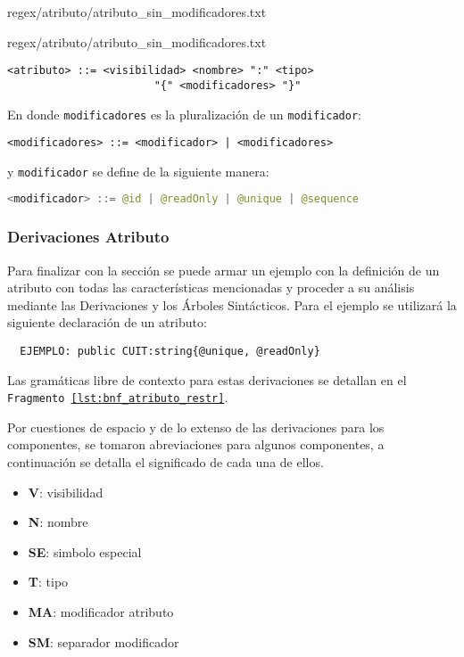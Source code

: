 \begin{lstinputlisting}[language=Director, basicstyle=\footnotesize\ttfamily, caption={Regex - Atributo (sin
Modificadores)}, label=lstreatr]{regex/atributo/atributo_sin_modificadores.txt}
\begin{lstinputlisting} [basicstyle=\footnotesize, caption={Regex - Modificadores
  (Atributo)},
  label=lstreatrmodif]{regex/atributo/atributo_sin_modificadores.txt}
\begin{lstlisting}[caption={BNF - Atributo}, basicstyle=\ttfamily\footnotesize,
label=lst:bnf_atributo_restr]
		<atributo> ::= <visibilidad> <nombre> ":" <tipo>
		               "{" <modificadores> "}"
\end{lstlisting}

En donde \texttt{modificadores} es la pluralización de un \texttt{modificador}:

\begin{lstlisting}[basicstyle=\ttfamily\footnotesize]
	<modificadores> ::= <modificador> | <modificadores>
\end{lstlisting}

y \texttt{modificador} se define de la siguiente manera:

\begin{lstlisting}[language=Java, basicstyle=\footnotesize\ttfamily, label=lst:bnf_atributo_modif]
	<modificador> ::= @id | @readOnly | @unique | @sequence
\end{lstlisting}

\subsubsection{Derivaciones Atributo}

Para finalizar con la sección se puede armar un ejemplo con la definición de un
atributo con todas las características mencionadas y proceder a su análisis
mediante las Derivaciones y los Árboles Sintácticos. Para el ejemplo se
utilizará la siguiente declaración de un atributo:

\begin{lstlisting}
  EJEMPLO: public CUIT:string{@unique, @readOnly}
\end{lstlisting}

Las gramáticas libre de contexto para estas derivaciones se detallan en el
\texttt{Fragmento \ref{lst:bnf_atributo_restr}}.

Por cuestiones de espacio y de lo extenso de las derivaciones para los
componentes, se tomaron abreviaciones para algunos componentes, a continuación
se detalla el significado de cada una de ellos.

\begin{itemize}
  \item \textbf{V}: visibilidad
  \item \textbf{N}: nombre
  \item \textbf{SE}: simbolo especial
  \item \textbf{T}: tipo
  \item \textbf{MA}: modificador atributo
  \item \textbf{SM}: separador modificador
\end{itemize}


\end{lstinputlisting}
\end{lstinputlisting}
